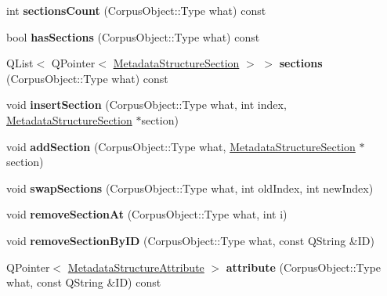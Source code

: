 \begin{DoxyCompactItemize}
int {\bfseries sections\+Count} (Corpus\+Object\+::\+Type what) const
\item 
\mbox{\label{class_metadata_structure_a12082e868e560448a6ef838f806b8990}} 
bool {\bfseries has\+Sections} (Corpus\+Object\+::\+Type what) const
\item 
\mbox{\label{class_metadata_structure_a4f59ab6a5a9796eca6d63ca53d203eec}} 
Q\+List$<$ Q\+Pointer$<$ \hyperlink{class_metadata_structure_section}{Metadata\+Structure\+Section} $>$ $>$ {\bfseries sections} (Corpus\+Object\+::\+Type what) const
\item 
\mbox{\label{class_metadata_structure_a57379974968e675a593ff956efa008c4}} 
void {\bfseries insert\+Section} (Corpus\+Object\+::\+Type what, int index, \hyperlink{class_metadata_structure_section}{Metadata\+Structure\+Section} $\ast$section)
\item 
\mbox{\label{class_metadata_structure_a6ea880cb9fbcd728a5a5a0f6bfa1df40}} 
void {\bfseries add\+Section} (Corpus\+Object\+::\+Type what, \hyperlink{class_metadata_structure_section}{Metadata\+Structure\+Section} $\ast$section)
\item 
\mbox{\label{class_metadata_structure_acc20309d54b5749551ea53b2da3b75e6}} 
void {\bfseries swap\+Sections} (Corpus\+Object\+::\+Type what, int old\+Index, int new\+Index)
\item 
\mbox{\label{class_metadata_structure_a9a6759d6667b90966d29c74bdee58e04}} 
void {\bfseries remove\+Section\+At} (Corpus\+Object\+::\+Type what, int i)
\item 
\mbox{\label{class_metadata_structure_a4ff4e0cdda04bdf38ff00f4a681d3a1a}} 
void {\bfseries remove\+Section\+By\+ID} (Corpus\+Object\+::\+Type what, const Q\+String \&ID)
\item 
\mbox{\label{class_metadata_structure_ab866939005c85998c5d8275739c0f2d2}} 
Q\+Pointer$<$ \hyperlink{class_metadata_structure_attribute}{Metadata\+Structure\+Attribute} $>$ {\bfseries attribute} (Corpus\+Object\+::\+Type what, const Q\+String \&ID) const

\end{DoxyCompactItemize}
